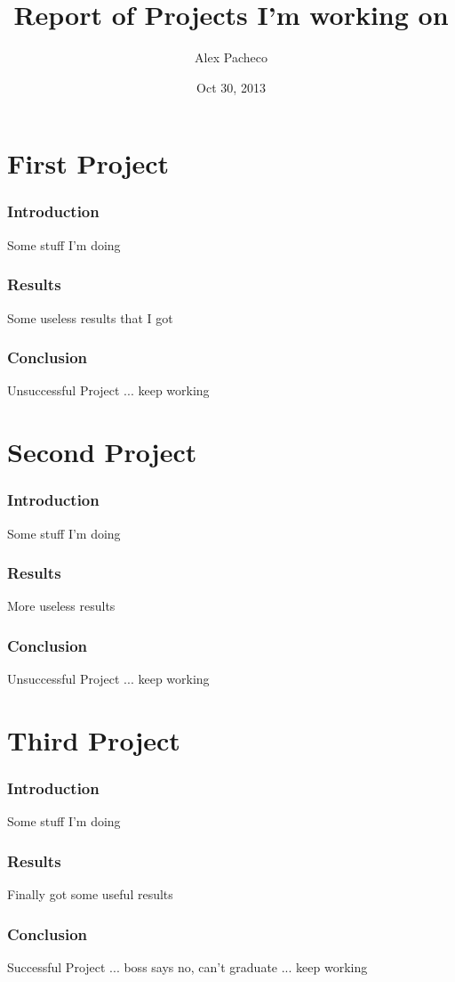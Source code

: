 \documentclass{article}
\title{Report of Projects I'm working on}
\author{Alex Pacheco}
\date{Oct 30, 2013}
\begin{document}
\maketitle
\part{First Project}
\section{Introduction}
Some stuff I'm doing
\section{Results}
Some useless results that I got
\section{Conclusion}
Unsuccessful Project ... keep working
\part{Second Project}
\section{Introduction}
Some stuff I'm doing
\section{Results}
More useless results
\section{Conclusion}
Unsuccessful Project ... keep working
\part{Third Project}
\section{Introduction}
Some stuff I'm doing
\section{Results}
Finally got some useful results
\section{Conclusion}
Successful Project ... boss says no, can't graduate ... keep working
\end{document}
